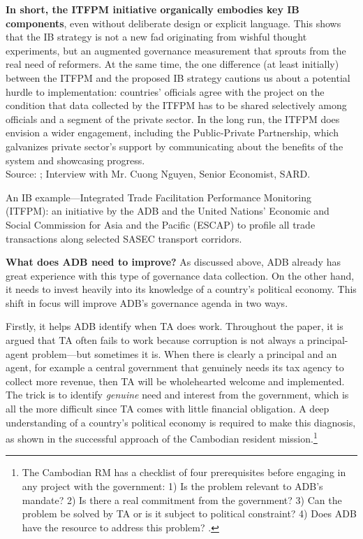 \documentclass[12pt]{article}
\begin{document}
\begin{textbox}
  \textbf{In short, the ITFPM initiative organically embodies key IB components}, even without deliberate design or explicit language. This shows that the IB strategy is not a new fad originating from wishful thought experiments, but an augmented governance measurement that sprouts from the real need of reformers. At the same time, the one difference (at least initially) between the ITFPM and the proposed IB strategy cautions us about a potential hurdle to implementation: countries' officials agree with the project on the condition that data collected by the ITFPM has to be shared selectively among officials and a segment of the private sector. In the long run, the ITFPM does envision a wider engagement, including the Public-Private Partnership, which galvanizes private sector's support by communicating about the benefits of the system and showcasing progress.\\

  Source: \citet{ADB-SARD2013}; Interview with Mr. Cuong Nguyen, Senior Economist, SARD.
  \caption[An IB example---ADB's Integrated Trade Facilitation Performance Monitoring]{An IB example---Integrated Trade Facilitation Performance Monitoring (ITFPM): an initiative by the ADB and the United Nations' Economic and Social Commission for Asia and the Pacific (ESCAP) to profile all trade transactions along selected SASEC transport corridors.}
  \label{box:tradefacilitation}
\end{textbox}

\textbf{What does ADB need to improve?} As discussed above, ADB already has great experience with this type of governance data collection. On the other hand, it needs to invest heavily into its knowledge of a country's political economy. This shift in focus will improve ADB's governance agenda in two ways.

Firstly, it helps ADB identify when TA does work. Throughout the paper, it is argued that TA often fails to work because corruption is not always a principal-agent problem---but sometimes it is. When there is clearly a principal and an agent, for example a central government that genuinely needs its tax agency to collect more revenue, then TA will be wholehearted welcome and implemented. The trick is to identify \textit{genuine} need and interest from the government, which is all the more difficult since TA comes with little financial obligation. A deep understanding of a country's political economy is required to make this diagnosis, as shown in the successful approach of the Cambodian resident mission.\footnote{The Cambodian RM has a checklist of four prerequisites before engaging in any project with the government: 1) Is the problem relevant to ADB's mandate? 2) Is there a real commitment from the government? 3) Can the problem be solved by TA or is it subject to political constraint? 4) Does ADB have the resource to address this problem? \citep{ADB-IED2013}.}
\end{document}
